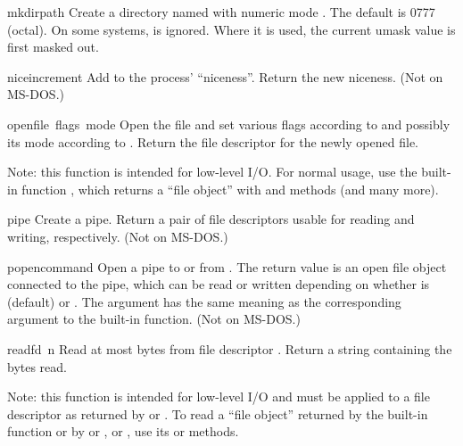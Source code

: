 \begin{funcdesc}{mkdir}{path}
Create a directory named  with numeric mode .
The default  is 0777 (octal).  On some systems, 
is ignored.  Where it is used, the current umask value is first
masked out.
\end{funcdesc}

\begin{funcdesc}{nice}{increment}
Add  to the process' ``niceness''.  Return the new niceness.
(Not on MS-DOS.)
\end{funcdesc}

\begin{funcdesc}{open}{file\, flags\, mode}
Open the file  and set various flags according to
 and possibly its mode according to .
Return the file descriptor for the newly opened file.

Note: this function is intended for low-level I/O.  For normal usage,
use the built-in function , which returns a ``file object''
with  and   methods (and many more).
\end{funcdesc}

\begin{funcdesc}{pipe}{}
Create a pipe.  Return a pair of file descriptors 
usable for reading and writing, respectively.
(Not on MS-DOS.)
\end{funcdesc}

\begin{funcdesc}{popen}{command}
Open a pipe to or from .  The return value is an open
file object connected to the pipe, which can be read or written
depending on whether  is  (default) or .
The  argument has the same meaning as the corresponding
argument to the built-in  function.
(Not on MS-DOS.)
\end{funcdesc}

\begin{funcdesc}{read}{fd\, n}
Read at most  bytes from file descriptor .
Return a string containing the bytes read.

Note: this function is intended for low-level I/O and must be applied
to a file descriptor as returned by  or
.  To read a ``file object'' returned by the
built-in function  or by  or
, or , use its
 or  methods.
\end{funcdesc}

